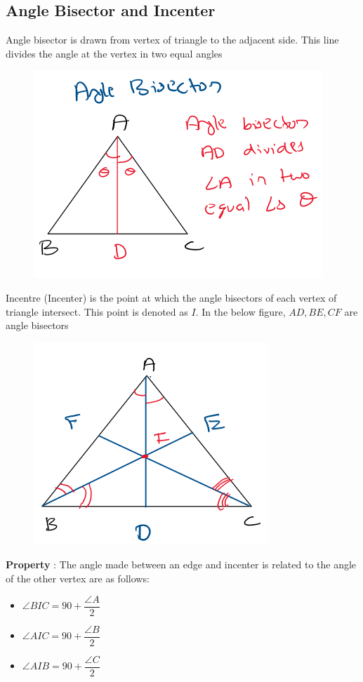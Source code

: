 \subsection{Angle Bisector and Incenter}
Angle bisector is drawn from vertex of triangle to the adjacent side. This line divides the angle at the vertex in two equal angles

\begin{figure}[h!]
    \centering
    \includegraphics[width=0.5\linewidth]{Quant//Geometry//Images//Triangles/angle_bisector.png}
\end{figure}

Incentre (Incenter) is the point at which the angle bisectors of each vertex of triangle intersect. This point is denoted as $I$. In the below figure, $AD, BE, CF$ are angle bisectors

\begin{figure}[h!]
    \centering
    \includegraphics[width=0.5\linewidth]{Quant//Geometry//Images//Triangles/incenter.png}
\end{figure}

\textbf{Property} : The angle made between an edge and incenter is related to the angle of the other vertex are as follows:
\begin{itemize}
    \item $\angle BIC = 90 + \dfrac{\angle A}{2}$
    \item $\angle AIC = 90 + \dfrac{\angle B}{2}$
    \item $\angle AIB = 90 + \dfrac{\angle C}{2}$
\end{itemize}

